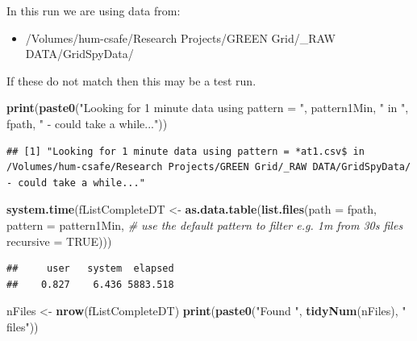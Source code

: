 \documentclass[]{article}
\newenvironment{Shaded}{\begin{snugshade}}{\end{snugshade}}
\newcommand{\KeywordTok}[1]{\textcolor[rgb]{0.13,0.29,0.53}{\textbf{#1}}}
\newcommand{\DataTypeTok}[1]{\textcolor[rgb]{0.13,0.29,0.53}{#1}}
\newcommand{\StringTok}[1]{\textcolor[rgb]{0.31,0.60,0.02}{#1}}
\newcommand{\CommentTok}[1]{\textcolor[rgb]{0.56,0.35,0.01}{\textit{#1}}}
\newcommand{\OtherTok}[1]{\textcolor[rgb]{0.56,0.35,0.01}{#1}}
\newcommand{\NormalTok}[1]{#1}
\providecommand{\tightlist}{%
  \setlength{\itemsep}{0pt}\setlength{\parskip}{0pt}}
\begin{document}
In this run we are using data from:

\begin{itemize}
\tightlist
\item
  /Volumes/hum-csafe/Research Projects/GREEN Grid/\_RAW
  DATA/GridSpyData/
\end{itemize}

If these do not match then this may be a test run.

\begin{Shaded}
\begin{Highlighting}[]
\KeywordTok{print}\NormalTok{(}\KeywordTok{paste0}\NormalTok{(}\StringTok{"Looking for 1 minute data using pattern = "}\NormalTok{, pattern1Min, }\StringTok{" in "}\NormalTok{, fpath, }\StringTok{" - could take a while..."}\NormalTok{))}
\end{Highlighting}
\end{Shaded}

\begin{verbatim}
## [1] "Looking for 1 minute data using pattern = *at1.csv$ in /Volumes/hum-csafe/Research Projects/GREEN Grid/_RAW DATA/GridSpyData/ - could take a while..."
\end{verbatim}

\begin{Shaded}
\begin{Highlighting}[]
\KeywordTok{system.time}\NormalTok{(fListCompleteDT <-}\StringTok{ }\KeywordTok{as.data.table}\NormalTok{(}\KeywordTok{list.files}\NormalTok{(}\DataTypeTok{path =}\NormalTok{ fpath, }\DataTypeTok{pattern =}\NormalTok{ pattern1Min, }\CommentTok{# use the default pattern to filter e.g. 1m from 30s files}
                                            \DataTypeTok{recursive =} \OtherTok{TRUE}\NormalTok{)))}
\end{Highlighting}
\end{Shaded}

\begin{verbatim}
##     user   system  elapsed 
##    0.827    6.436 5883.518
\end{verbatim}

\begin{Shaded}
\begin{Highlighting}[]
\NormalTok{nFiles <-}\StringTok{ }\KeywordTok{nrow}\NormalTok{(fListCompleteDT)}
\KeywordTok{print}\NormalTok{(}\KeywordTok{paste0}\NormalTok{(}\StringTok{"Found "}\NormalTok{, }\KeywordTok{tidyNum}\NormalTok{(nFiles), }\StringTok{" files"}\NormalTok{))}
\end{Highlighting}
\end{Shaded}
\end{document}
